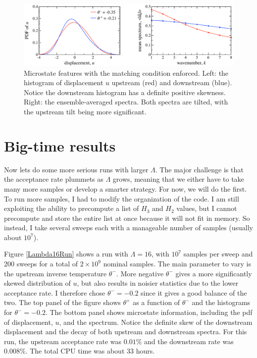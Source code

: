 \documentclass[12pt]{article}
\newcommand{\np}{\newpage \noindent}
\begin{document}
\begin{figure}%
\begin{center}
\includegraphics[width = 0.95 \textwidth]{match_micro}
\caption{Microstate features with the matching condition enforced. Left: the histogram of displacement $u$ upstream (red) and downstream (blue). Notice the downstream histogram has a definite positive skewness. Right: the ensemble-averaged spectra. Both spectra are tilted, with the upstream tilt being more significant.}
\label{match_micro}
\end{center}
\end{figure}

\np
\section{Big-time results}

Now lets do some more serious runs with larger $\Lambda$. The major challenge is that the acceptance rate plummets as $\Lambda$ grows, meaning that we either have to take many more samples or develop a smarter strategy. For now, we will do the first. To run more samples, I had to modify the organization of the code. I am still exploiting the ability to precompute a list of $H_3$ and $H_2$ values, but I cannot precompute and store the entire list at once because it will not fit in memory. So instead, I take several sweeps each with a manageable number of samples (usually about $10^7$).

Figure \ref{Lambda16Run} shows a run with $\Lambda = 16$, with $10^7$ samples per sweep and 200 sweeps for a total of $2 \times 10^9$ nominal samples. The main parameter to vary is the upstream inverse temperature $\theta^-$. More negative $\theta^-$ gives a more significantly skewed distribution of $u$, but also results in noisier statistics due to the lower acceptance rate. I therefore chose $\theta^- = -0.2$ since it gives a good balance of the two. The top panel of the figure shows $\theta^+$ as a function of $\theta^-$ and the histograms for $\theta^- = -0.2$. The bottom panel shows microstate information, including the pdf of displacement, $u$, and the spectrum. Notice the definite skew of the downstream displacement and the decay of both upstream and downstream spectra. For this run, the upstream acceptance rate was $0.01\%$ and the downstream rate was $0.008\%$. The total CPU time was about 33 hours.
\end{document}
